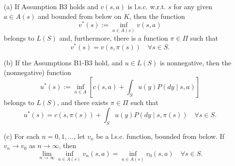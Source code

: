 \begin{lemma}\label{lemma:properties}
    \begin{itemize}
    \item[(a)] If Assumption B3 holds and $v(s,a)$ is l.s.c. w.r.t. $s$ for any given $a\in A(s)$ and bounded from below on $K$, then the function
    \[
    v^*(s) := \inf_{a \in A(s)} v(s, a)
    \]
    belongs to $L(S)$ and, furthermore, there is a function $\pi \in \Pi$ such that
    \[
    v^*(s) = v(s, \pi(s)) \quad \forall s \in S.
    \]
    
    \item[(b)] If the Assumptions B1-B3 hold, and $u \in L(S)$ is nonnegative, then the (nonnegative) function
    \[
    u^{*}(s) := \inf_{a \in A} \left[ c(s, a) + \int_{S} u(y) P(dy \mid s, a) \right]
    \]
    belongs to $L(S)$, and there exists $\pi \in \Pi$ such that
    \[
    u^*(s) = c(s, \pi(s)) + \int_{S} u(y) P(dy \mid s, \pi(s)) \quad \forall s \in S.
    \]

    \item[(c)] For each $n = 0, 1, \dots$, let $v_n$ be a l.s.c. function, bounded from below. If $v_n \to v_0$ as $n \to \infty$, then
    \[
    \lim_{n \to \infty} \inf_{a \in A(s)} v_n(s, a) = \inf_{a \in A(s)} v_0(s, a) \quad \forall s \in S.
    \]
\end{itemize}
\end{lemma}
